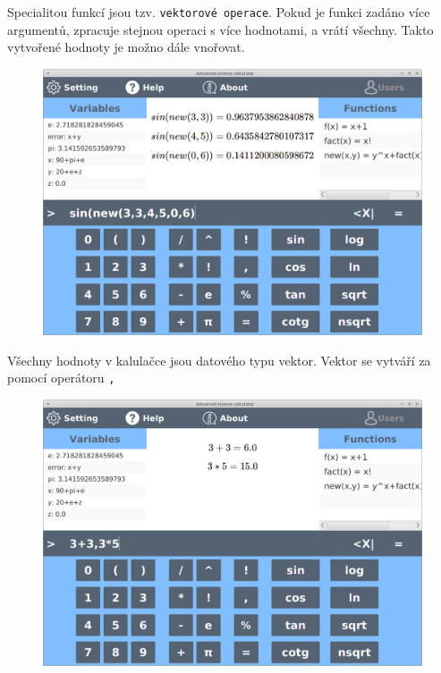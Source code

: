 \documentclass[11pt, a4paper, titlepage]{article}
\begin{document}
	Specialitou funkcí jsou tzv. \texttt{vektorové operace}. Pokud je funkci zadáno více argumentů, zpracuje 
	stejnou operaci s více hodnotami, a vrátí všechny. Takto vytvořené hodnoty je možno dále vnořovat.
	
	
	\begin{figure}[h!]
	    \centering
	    \includegraphics[scale=0.3]{./assets/vector.png}
	\end{figure}

	\newpage
	Všechny hodnoty v kalulačce jsou datového typu vektor. Vektor se vytváří za pomocí operátoru \texttt{,}

	\begin{figure}[h!]
	    \centering
	    \includegraphics[scale=0.3]{./assets/st_vect.png}
	\end{figure}
\end{document}
